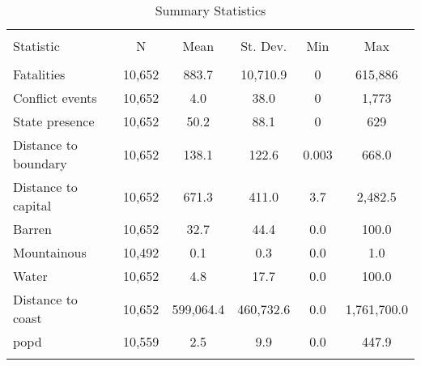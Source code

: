 
\begin{sidewaystable}[!htbp] \centering 
  \caption{Summary Statistics} 
  \label{summarystats} 
\begin{tabular}{@{\extracolsep{1pt}}lccccc} 
\\[-1.8ex]\hline 
\hline \\[-1.8ex] 
Statistic & \multicolumn{1}{c}{N} & \multicolumn{1}{c}{Mean} & \multicolumn{1}{c}{St. Dev.} & \multicolumn{1}{c}{Min} & \multicolumn{1}{c}{Max} \\ 
\hline \\[-1.8ex] 
Fatalities & 10,652 & 883.7 & 10,710.9 & 0 & 615,886 \\ 
Conflict events & 10,652 & 4.0 & 38.0 & 0 & 1,773 \\ 
State presence & 10,652 & 50.2 & 88.1 & 0 & 629 \\ 
Distance to boundary & 10,652 & 138.1 & 122.6 & 0.003 & 668.0 \\ 
Distance to capital & 10,652 & 671.3 & 411.0 & 3.7 & 2,482.5 \\ 
Barren & 10,652 & 32.7 & 44.4 & 0.0 & 100.0 \\ 
Mountainous & 10,492 & 0.1 & 0.3 & 0.0 & 1.0 \\ 
Water & 10,652 & 4.8 & 17.7 & 0.0 & 100.0 \\ 
Distance to coast & 10,652 & 599,064.4 & 460,732.6 & 0.0 & 1,761,700.0 \\ 
popd & 10,559 & 2.5 & 9.9 & 0.0 & 447.9 \\ 
\hline \\[-1.8ex] 
\end{tabular} 
\end{sidewaystable} 
